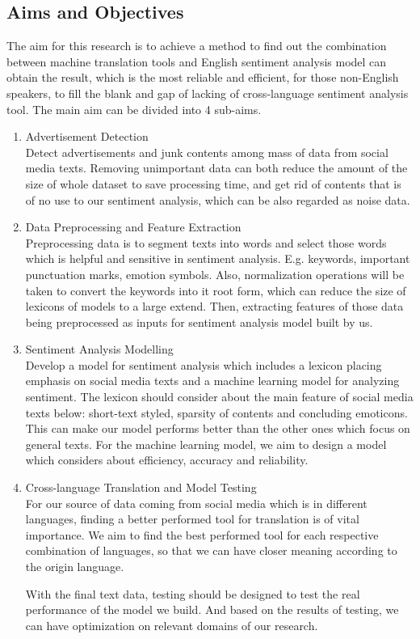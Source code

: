 \documentclass[conference]{IEEEtran}
\begin{document}
\subsection{Aims and Objectives}
The aim for this research is to achieve a method to find out the combination
between machine translation tools and English sentiment analysis model can
obtain the result, which is the most reliable and efficient, for those
non-English speakers, to fill the blank and gap of lacking of cross-language
sentiment analysis tool.
The main aim can be divided into 4 sub-aims.
\begin{enumerate}
  \item Advertisement Detection \\
Detect advertisements and junk contents among mass of data from social media
texts. Removing unimportant data can both reduce the amount of the size of whole
dataset to save processing time, and get rid of contents that is of no use to
our sentiment analysis, which can be also regarded as noise data.
  \item Data Preprocessing and Feature Extraction \\
Preprocessing data is to segment texts into words and select those words which
is helpful and sensitive in sentiment analysis. E.g. keywords, important
punctuation marks, emotion symbols. Also, normalization operations will be taken
to convert the keywords into it root form, which can reduce the size of lexicons
of models to a large extend. Then, extracting features of those data being
preprocessed as inputs for sentiment analysis model built by us.
  \item Sentiment Analysis Modelling \\
Develop a model for sentiment analysis which includes a lexicon placing emphasis on social media texts and a machine learning model for analyzing sentiment.
The lexicon should consider about the main feature of social media texts below:
short-text styled, sparsity of contents and concluding emoticons. This can make
our model performs better than the other ones which focus on general texts.
For the machine learning model, we aim to design a model which considers about
efficiency, accuracy and reliability.
  \item Cross-language Translation and Model Testing \\
For our source of data coming from social media which is in different languages,
finding a better performed tool for translation is of vital importance. We aim
to find the best performed tool for each respective combination of languages, so
that we can have closer meaning according to the origin language.

With the final text data, testing should be designed to test the real
performance of the model we build. And based on the results of testing, we can
have optimization on relevant domains of our research.

\end{enumerate}
\end{document}
